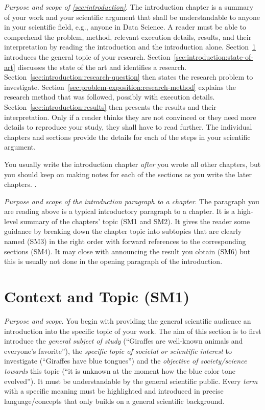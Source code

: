 \documentclass[
  numbers=noenddot,
  english,  %
  a4paper,  %
  twoside,  %
  bibliography=totoc,
  headsepline,
  cleardoublepage=empty,
  parskip=half,
  draft=false
]{scrbook}
\theoremstyle{break}
\begin{document}
\emph{Purpose and scope of \cref{sec:introduction}}.
The introduction chapter is a summary of your work and your scientific argument that shall be understandable to anyone in your scientific field, e.g., anyone in Data Science.
A reader must be able to comprehend the problem, method, relevant execution details, results, and their interpretation by reading the introduction and the introduction alone.
Section~\ref{sec:introduction:topic} introduces the general topic of your research.
Section~\ref{sec:introduction:state-of-art} discusses the state of the art and identifies a research.
Section~\ref{sec:introduction:research-question} then states the research problem to investigate.
Section~\ref{sec:problem-exposition:research-method} explains the research method that was followed, possibly with execution details.
Section~\ref{sec:introduction:results} then presents the results and their interpretation.
Only if a reader thinks they are not convinced or they need more details to reproduce your study, they shall have to read further.
The individual chapters and sections provide the details for each of the steps in your scientific argument.

You usually write the introduction chapter \emph{after} you wrote all other chapters, but you should keep on making notes for each of the sections as you write the later chapters.
.

\emph{Purpose and scope of the introduction paragraph to a chapter}.
The paragraph you are reading above is a typical introductory paragraph to a chapter.
It is a high-level summary of the chapters' topic (SM1 and SM2).
It gives the reader some guidance by breaking down the chapter topic into subtopics that are clearly named (SM3) in the right order with forward references to the corresponding sections (SM4).
It may close with announcing the result you obtain (SM6) but this is usually not done in the opening paragraph of the introduction.

\section{Context and Topic (SM1)}\label{sec:introduction:topic}

\emph{Purpose and scope}.
You begin with providing the general scientific audience an introduction into the specific topic of your work.
The aim of this section is to first introduce the \emph{general subject of study} (``Giraffes are well-known animals and everyone's favorite''), the \emph{specific topic of societal or scientific interest} to investigate (``Giraffes have blue tongues'') and the \emph{objective of society/science towards} this topic (``it is unknown at the moment how the blue color tone evolved'').
It must be understandable by the general scientific public.
Every \emph{term} with a specific meaning must be highlighted and introduced in precise language/concepts that only builds on a general scientific background.
\end{document}
